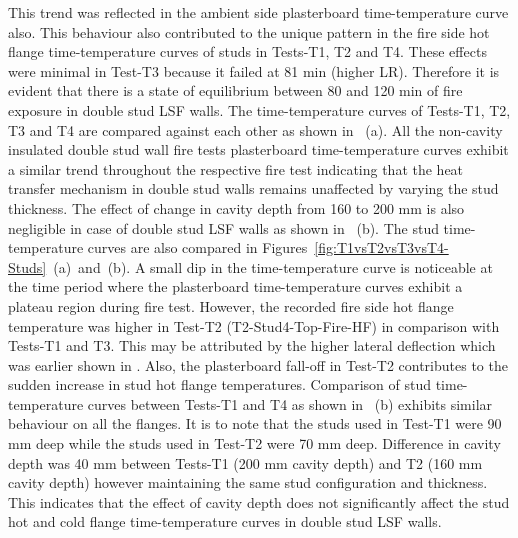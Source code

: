 This trend was reflected in the ambient side plasterboard time-temperature curve also. This behaviour also contributed to the unique pattern in the fire side hot flange time-temperature curves of studs in Tests-T1, T2 and T4. These effects were minimal in Test-T3 because it failed at 81 min (higher LR). Therefore it is evident that there is a state of equilibrium between 80 and 120 min of fire exposure in double stud LSF walls. The time-temperature curves of Tests-T1, T2, T3 and T4 are compared against each other as shown in ~(a). All the non-cavity insulated double stud wall fire tests plasterboard time-temperature curves exhibit a similar trend throughout the respective fire test indicating that the heat transfer mechanism in double stud walls remains unaffected by varying the stud thickness. The effect of change in cavity depth from 160 to 200 mm is also negligible in case of double stud LSF walls as shown in ~(b). The stud time-temperature curves are also compared in Figures~\ref{fig:T1vsT2vsT3vsT4-Studs}~(a)~and~(b). A small dip in the time-temperature curve is noticeable at the time period where the plasterboard time-temperature curves exhibit a plateau region during fire test. However, the recorded fire side hot flange temperature was higher in Test-T2 (T2-Stud4-Top-Fire-HF) in comparison with Tests-T1 and T3. This may be attributed by the higher lateral deflection which was earlier shown in . Also, the plasterboard fall-off in Test-T2 contributes to the sudden increase in stud hot flange temperatures. Comparison of stud time-temperature curves between Tests-T1 and T4 as shown in ~(b) exhibits similar behaviour on all the flanges. It is to note that the studs used in Test-T1 were 90 mm deep while the studs used in Test-T2 were 70 mm deep. Difference in cavity depth was 40 mm between Tests-T1 (200 mm cavity depth) and T2 (160 mm cavity depth) however maintaining the same stud configuration and thickness. This indicates that the effect of cavity depth does not significantly affect the stud hot and cold flange time-temperature curves in double stud LSF walls. 

